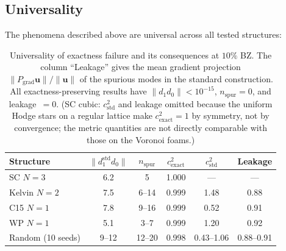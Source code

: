 \documentclass[preprint,12pt]{elsarticle}
\begin{document}
\subsection{Universality}
\label{sec:universality}

The phenomena described above are universal across all tested structures:

\begin{table}[h]
\centering
\begin{tabular}{lccccc}
\toprule
Structure & $\|d_1^{\mathrm{std}} d_0\|$ & $n_{\mathrm{spur}}$ & $c^2_{\mathrm{exact}}$ & $c^2_{\mathrm{std}}$ & Leakage \\
\midrule
SC $N{=}3$     & 6.2  & 5      & 1.000 & ---   & ---  \\
Kelvin $N{=}2$ & 7.5  & 6--14  & 0.999 & 1.48  & 0.88 \\
C15 $N{=}1$    & 7.8  & 9--16  & 0.999 & 0.52  & 0.91 \\
WP $N{=}1$     & 5.1  & 3--7   & 0.999 & 1.20  & 0.92 \\
Random (10 seeds) & 9--12 & 12--20 & 0.998 & 0.43--1.06 & 0.88--0.91 \\
\bottomrule
\end{tabular}
\caption{Universality of exactness failure and its consequences at $10\%$ BZ. The column ``Leakage'' gives the mean gradient projection $\|P_{\mathrm{grad}}\mathbf{u}\|/\|\mathbf{u}\|$ of the spurious modes in the standard construction. All exactness-preserving results have $\|d_1 d_0\| < 10^{-15}$, $n_{\mathrm{spur}} = 0$, and leakage~$= 0$. (SC cubic: $c^2_{\mathrm{std}}$ and leakage omitted because the uniform Hodge stars on a regular lattice make $c^2_{\mathrm{exact}} = 1$ by symmetry, not by convergence; the metric quantities are not directly comparable with those on the Voronoi foams.)}
\label{tab:universality}
\end{table}
\end{document}
